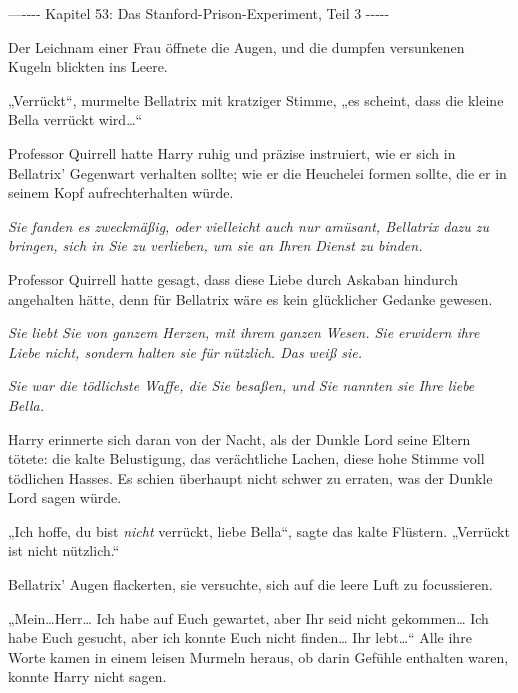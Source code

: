 

\hypertarget{das-stanford-prison-experiment-teil-3}{%

—\/-\/-\/-\/- Kapitel 53: Das Stanford-Prison-Experiment, Teil 3 -\/-\/-\/-\/-

Der Leichnam einer Frau öffnete die Augen, und die dumpfen versunkenen Kugeln blickten ins Leere.

„Verrückt“, murmelte Bellatrix mit kratziger Stimme, „es scheint, dass die kleine Bella verrückt wird…“

Professor Quirrell hatte Harry ruhig und präzise instruiert, wie er sich in Bellatrix' Gegenwart verhalten sollte; wie er die Heuchelei formen sollte, die er in seinem Kopf aufrechterhalten würde.

\emph{Sie fanden es zweckmäßig, oder vielleicht auch nur amüsant, Bellatrix dazu zu bringen, sich in Sie zu verlieben, um sie an Ihren Dienst zu binden.}

Professor Quirrell hatte gesagt, dass diese Liebe durch Askaban hindurch angehalten hätte, denn für Bellatrix wäre es kein glücklicher Gedanke gewesen.

\emph{Sie liebt Sie von ganzem Herzen, mit ihrem ganzen Wesen. Sie erwidern ihre Liebe nicht, sondern halten sie für nützlich. Das weiß sie.}

\emph{Sie war die tödlichste Waffe, die Sie besaßen, und Sie nannten sie Ihre liebe Bella.}

Harry erinnerte sich daran von der Nacht, als der Dunkle Lord seine Eltern tötete: die kalte Belustigung, das verächtliche Lachen, diese hohe Stimme voll tödlichen Hasses. Es schien überhaupt nicht schwer zu erraten, was der Dunkle Lord sagen würde.

„Ich hoffe, du bist \emph{nicht} verrückt, liebe Bella“, sagte das kalte Flüstern. „Verrückt ist nicht nützlich.“

Bellatrix' Augen flackerten, sie versuchte, sich auf die leere Luft zu focussieren.

„Mein…Herr… Ich habe auf Euch gewartet, aber Ihr seid nicht gekommen… Ich habe Euch gesucht, aber ich konnte Euch nicht finden… Ihr lebt…“ Alle ihre Worte kamen in einem leisen Murmeln heraus, ob darin Gefühle enthalten waren, konnte Harry nicht sagen.

}
